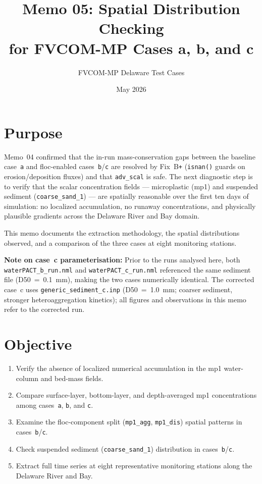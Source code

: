 \documentclass[11pt]{article}
\title{Memo 05: Spatial Distribution Checking\\
       for FVCOM-MP Cases a, b, and c}
\author{FVCOM-MP Delaware Test Cases}
\date{May 2026}
\begin{document}
\sloppy
\maketitle

\section*{Purpose}

Memo~04 confirmed that the in-run mass-conservation gaps between the baseline
case~\texttt{a} and floc-enabled cases~\texttt{b}/\texttt{c} are resolved by
Fix~B\texttt{+} (\texttt{isnan()} guards on erosion/deposition fluxes) and that
\texttt{adv\_scal} is safe.  The next diagnostic step is to verify that the
scalar concentration fields --- microplastic (mp1) and suspended sediment
(\texttt{coarse\_sand\_1}) --- are spatially reasonable over the first ten days
of simulation: no localized accumulation, no runaway concentrations, and
physically plausible gradients across the Delaware River and Bay domain.

This memo documents the extraction methodology, the spatial distributions
observed, and a comparison of the three cases at eight monitoring stations.

\textbf{Note on case~c parameterisation:}
Prior to the runs analysed here, both \texttt{waterPACT\_b\_run.nml} and
\texttt{waterPACT\_c\_run.nml} referenced the same sediment file
(D50~=~0.1~mm), making the two cases numerically identical.
The corrected case~c uses \texttt{generic\_sediment\_c.inp} (D50~=~1.0~mm;
coarser sediment, stronger heteroaggregation kinetics); all figures and
observations in this memo refer to the corrected run.

\section*{Objective}

\begin{enumerate}[(1)]
  \item Verify the absence of localized numerical accumulation in the mp1
        water-column and bed-mass fields.
  \item Compare surface-layer, bottom-layer, and depth-averaged mp1
        concentrations among cases~\texttt{a}, \texttt{b}, and \texttt{c}.
  \item Examine the floc-component split (\texttt{mp1\_agg},
        \texttt{mp1\_dis}) spatial patterns in cases~\texttt{b}/\texttt{c}.
  \item Check suspended sediment (\texttt{coarse\_sand\_1}) distribution in
        cases~\texttt{b}/\texttt{c}.
  \item Extract full time series at eight representative monitoring stations
        along the Delaware River and Bay.
\end{enumerate}
\end{document}
